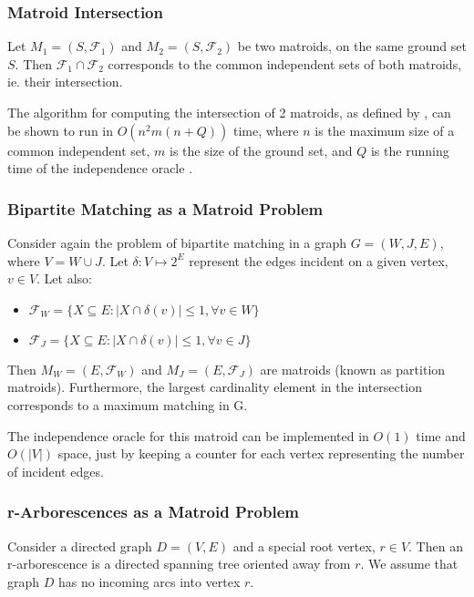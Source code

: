\documentclass[a4,11pt]{article}
\begin{document}
\subsubsection{Matroid Intersection}
Let $M_1 = (S, \mathcal{F}_1)$ and $M_2 = (S, \mathcal{F}_2)$ be two matroids, on the same ground set $S$.
Then $\mathcal{F}_1 \cap \mathcal{F}_2$ corresponds to the common independent sets of both matroids, ie. their intersection.

The algorithm for computing the intersection of 2 matroids, as defined by \textcite{schrijver_combinatorial_2013}, can be shown to run in $O(n^2 m (n + Q))$ time, where $n$ is the maximum size of a common independent set, $m$ is the size of the ground set, and $Q$ is the running time of the independence oracle \cite{schrijver_combinatorial_2013}.

\subsubsection{Bipartite Matching as a Matroid Problem}
Consider again the problem of bipartite matching in a graph $G = (W, J, E)$, where $V = W \cup J$.
Let $\delta : V \mapsto 2^E$ represent the edges incident on a given vertex, $v \in V$. Let also:

\begin{itemize}
    \setlength\itemsep{-.1em}
    \item $\mathcal{F}_W = \{X \subseteq E: |X \cap \delta(v)| \le 1, \forall v \in W\}$
    \item $\mathcal{F}_J = \{X \subseteq E: |X \cap \delta(v)| \le 1, \forall v \in J\}$
\end{itemize}

Then $M_W = (E, \mathcal{F}_W)$ and $M_J = (E, \mathcal{F}_J)$ are matroids \cite{goemans_handout_2011} (known as partition matroids). Furthermore, the largest cardinality element in the intersection corresponds to a maximum matching in G.

The independence oracle for this matroid can be implemented in $O(1)$ time and $O(\left|V\right|)$ space, just by keeping a counter for each vertex representing the number of incident edges.

\subsubsection{r-Arborescences as a Matroid Problem}
Consider a directed graph $D = (V, E)$ and a special root vertex, $r \in V$. Then an r-arborescence is a directed spanning tree oriented away from $r$. We assume that graph $D$ has no incoming arcs into vertex $r$.
\end{document}
